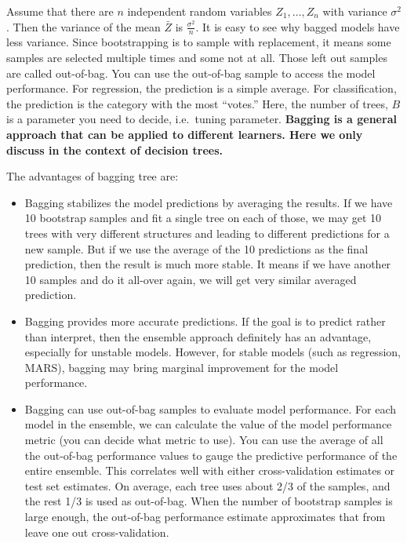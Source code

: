 \documentclass[
  12pt,
]{krantz}
\begin{document}
Assume that there are \(n\) independent random variables \(Z_1,\dots,Z_n\) with variance \(\sigma^2\). Then the variance of the mean \(\bar{Z}\) is \(\frac{\sigma^2}{n}\). It is easy to see why bagged models have less variance. Since bootstrapping is to sample with replacement, it means some samples are selected multiple times and some not at all. Those left out samples are called out-of-bag. You can use the out-of-bag sample to access the model performance. For regression, the prediction is a simple average. For classification, the prediction is the category with the most ``votes.'' Here, the number of trees, \(B\) is a parameter you need to decide, i.e.~tuning parameter. \textbf{Bagging is a general approach that can be applied to different learners. Here we only discuss in the context of decision trees.}

The advantages of bagging tree are:

\begin{itemize}
\item
  Bagging stabilizes the model predictions by averaging the results. If we have 10 bootstrap samples and fit a single tree on each of those, we may get 10 trees with very different structures and leading to different predictions for a new sample. But if we use the average of the 10 predictions as the final prediction, then the result is much more stable. It means if we have another 10 samples and do it all-over again, we will get very similar averaged prediction.
\item
  Bagging provides more accurate predictions. If the goal is to predict rather than interpret, then the ensemble approach definitely has an advantage, especially for unstable models. However, for stable models (such as regression, MARS), bagging may bring marginal improvement for the model performance.
\item
  Bagging can use out-of-bag samples to evaluate model performance. For each model in the ensemble, we can calculate the value of the model performance metric (you can decide what metric to use). You can use the average of all the out-of-bag performance values to gauge the predictive performance of the entire ensemble. This correlates well with either cross-validation estimates or test set estimates. On average, each tree uses about 2/3 of the samples, and the rest 1/3 is used as out-of-bag. When the number of bootstrap samples is large enough, the out-of-bag performance estimate approximates that from leave one out cross-validation.
\end{itemize}
\end{document}

